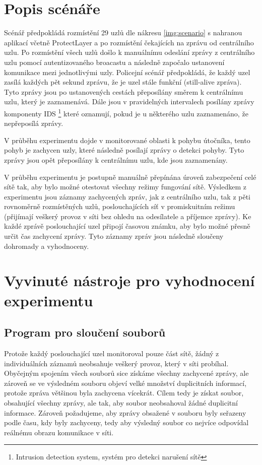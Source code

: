 \documentclass[11pt,final,twoside]{fithesis2}
\begin{document}
\section{Popis scénáře}
Scénář předpokládá rozmístění 29 uzlů dle nákresu \ref{img:scenario} s nahranou aplikací včetně ProtectLayer a po rozmístění čekajících 
na zprávu od centrálního uzlu. Po rozmístění všech uzlů došlo k manuálnímu odeslání zprávy z centrálního uzlu pomocí autentizovaného 
broacastu a následně započalo ustanovení komunikace mezi jednotlivými uzly. Policejní scénář předpokládá, že každý uzel zasílá každých 
pět sekund zprávu, že je uzel stále funkční (still-alive zpráva). Tyto zprávy jsou po ustanovených cestách přeposílány směrem k 
centrálnímu uzlu, který je zaznamenává. Dále jsou v pravidelných intervalech posílány zprávy komponenty IDS \footnote{Intrusion detection 
system, systém pro detekci narušení sítě} které oznamují, pokud je u některého uzlu zaznamenáno, že nepřeposílá zprávy. 

V průběhu experimentu dojde v monitorované oblasti k pohybu útočníka, tento pohyb je zachycen uzly, které následně posílají zprávy
o detekci pohyby. Tyto zprávy jsou opět přeposílány k centrálnímu uzlu, kde jsou zaznamenány.  

V průběhu experimentu je postupně manuálně přepínána úroveň zabezpečení celé sítě tak, aby bylo možné otestovat všechny režimy fungování 
sítě. Výsledkem z experimentu jsou záznamy zachycených zpráv, jak z centrálního uzlu, tak z pěti rovnoměrně rozmístěných uzlů, poslouchajících 
síť v promiskuitním režimu (přijímají veškerý provoz v síti bez ohledu na odesílatele a příjemce zprávy). Ke každé zprávě poslouchající 
uzel připojí časovou známku, aby bylo možné přesně určit čas zachycení zprávy.  Tyto záznamy zpráv jsou následně sloučeny dohromady a 
vyhodnoceny.


\section{Vyvinuté nástroje pro vyhodnocení experimentu}
\subsection{Program pro sloučení souborů}
Protože každý poslouchající uzel monitoroval pouze část sítě, žádný z individuálních záznamů neobsahuje veškerý provoz, který v síti 
probíhal. Obyčejným spojením všech souborů sice získáme všechny zachycené zprávy, ale zároveň se ve výsledném souboru objeví velké 
množství duplicitních informací, protože zpráva většinou byla zachycena vícekrát. Cílem tedy je získat soubor, obsahující všechny zprávy, 
ale tak, aby soubor neobsahoval žádné duplicitní informace. Zároveň požadujeme, aby zprávy obsažené v souboru byly seřazeny podle času, 
kdy byly zachyceny, tedy aby výsledný soubor co nejvíce odpovídal reálnému obrazu komunikace v síti. 
\end{document}
